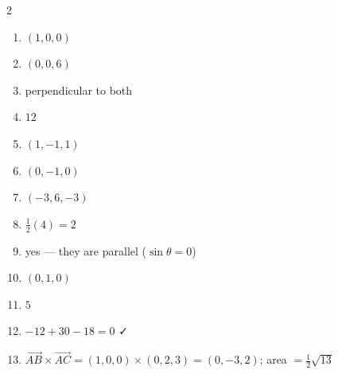 \documentclass[11pt]{article}
\begin{document}
\begin{keybox}
\begin{multicols}{2}
\small
\begin{enumerate}[leftmargin=*,itemsep=3pt]
  \item $(1,0,0)$
  \item $(0,0,6)$
  \item perpendicular to both
  \item $12$
  \item $(1,-1,1)$
  \item $(0,-1,0)$
  \item $(-3,6,-3)$
  \item $\tfrac12(4)=2$
  \item yes — they are parallel ($\sin\theta=0$)
  \item $(0,1,0)$
  \item $5$
  \item $-12+30-18=0$ ✓
  \item $\vec{AB}\times\vec{AC}=(1,0,0)\times(0,2,3)=(0,-3,2)$; area $=\tfrac12\sqrt{13}$
\end{enumerate}
\end{multicols}
\end{keybox}
\end{document}
